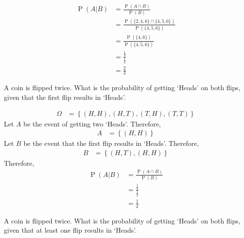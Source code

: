 \documentclass[titlepage, fleqn, a4paper, 12pt, twoside]{article}
\theoremstyle{definition}
\theoremstyle{theorem}
\DeclareMathOperator{\prob}{\mathrm{P}}
\begin{document}
\begin{solution}
	\begin{align*}
		\prob(A|B) & = \frac{\prob(A \cap B)}{\prob(B)}                                                   \\
                           & = \frac{\prob\left( \{2,4,6\} \cap \{4,5,6\} \right)}{\prob\left( \{4,5,6\} \right)} \\
                           & = \frac{\prob\left( \{4,6\} \right)}{\prob\left( \{4,5,6\} \right)}                  \\
                           & = \frac{\frac{1}{3}}{\frac{1}{2}}                                                    \\
                           & = \frac{2}{3}
	\end{align*}
\end{solution}

\begin{question}
	A coin is flipped twice.
	What is the probability of getting `Heads' on both flips, given that the first flip results in `Heads'.
\end{question}

\begin{solution}
	\begin{align*}
		\Omega & = \left\{ (H,H),(H,T),(T,H),(T,T) \right\}
	\end{align*}
	Let $A$ be the event of getting two `Heads'.
	Therefore,
	\begin{align*}
		A & = \left\{ (H,H) \right\}
	\end{align*}
	Let $B$ be the event that the first flip results in `Heads'.
	Therefore,
	\begin{align*}
		B & = \left\{ (H,T),(H,H) \right\}
	\end{align*}
	Therefore,
	\begin{align*}
		\prob(A|B) & = \frac{\prob(A \cap B)}{\prob(B)} \\
                           & = \frac{\frac{1}{4}}{\frac{1}{2}}  \\
                           & = \frac{1}{2}
	\end{align*}
\end{solution}

\begin{question}
	A coin is flipped twice.
	What is the probability of getting `Heads' on both flips, given that at least one flip results in `Heads'.
\end{question}
\end{document}
